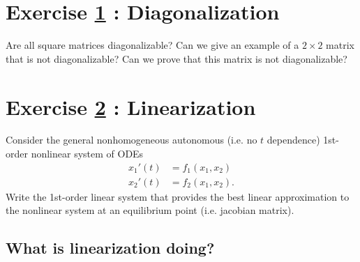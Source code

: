%
%
%
%
%

\section{Exercise \ref{sec : Math211 Summer2019 ExamOral : JCF} : Diagonalization}
\label{sec : Math211 Summer2019 ExamOral : JCF}

Are all square matrices diagonalizable? Can we give an example of a $2 \times 2$ matrix that is not diagonalizable? Can we prove that this matrix is not diagonalizable?





%
%
%
%
%

\section{Exercise \ref{sec : Math211 Summer2019 ExamOral : Linearization} : Linearization}
\label{sec : Math211 Summer2019 ExamOral : Linearization}

Consider the general nonhomogeneous autonomous (i.e. no $t$ dependence) 1st-order nonlinear system of ODEs
\begin{align*}
x_{1}'(t)
&=
f_{1}(x_{1},x_{2})
\\
x_{2}'(t)
&=
f_{2}(x_{1},x_{2}).
\end{align*}
Write the 1st-order linear system that provides the best linear approximation to the nonlinear system at an equilibrium point (i.e. jacobian matrix).



\subsection{What is linearization doing?}

